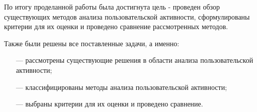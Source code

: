 По итогу проделанной работы была достигнута цель - проведен обзор существующих методов анализа пользовательской активности, сформулированы критерии для их оценки и проведено сравнение рассмотренных методов.

Также были решены все поставленные задачи, а именно:

\begin{itemize}
	\item[---] рассмотрены существующие решения в области анализа пользовательской активности;
	\item[---] классифицированы методы анализа пользовательской активности;
	\item[---] выбраны критерии для их оценки и проведено сравнение.
\end{itemize}